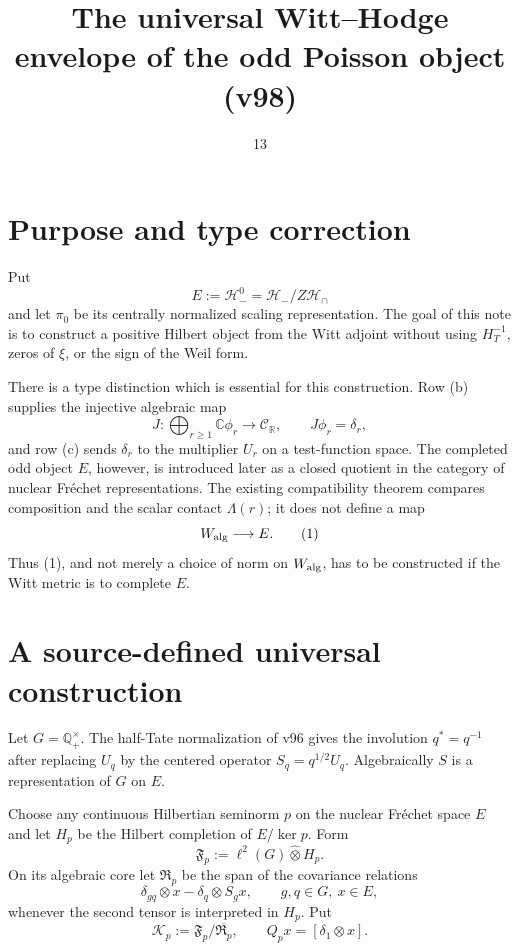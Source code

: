 \documentclass[11pt]{article}
\title{The universal Witt--Hodge envelope of the odd Poisson object (v98)}
\date{13}
\begin{document}
\maketitle

\section{Purpose and type correction}

Put
\[
 E:=\mathcal H_-^0=\mathcal H_-/Z\mathcal H_\cap
\]
and let $\pi_0$ be its centrally normalized scaling representation.  The
goal of this note is to construct a positive Hilbert object from the Witt
adjoint without using $H_T^{-1}$, zeros of $\xi$, or the sign of the Weil
form.

There is a type distinction which is essential for this construction.
Row (b) supplies the injective algebraic map
\[
 J:\bigoplus_{r\ge1}\mathbb C\phi_r\longrightarrow\mathcal C_{\mathbb R},
 \qquad J\phi_r=\delta_r,
\]
and row (c) sends $\delta_r$ to the multiplier $U_r$ on a test-function
space.  The completed odd object $E$, however, is introduced later as a
closed quotient in the category of nuclear Fr\'echet representations.
The existing compatibility theorem compares composition and the scalar
contact $\Lambda(r)$; it does not define a map
\begin{equation}
       W_{\rm alg}\longrightarrow E.                 \tag{1}
\end{equation}
Thus (1), and not merely a choice of norm on $W_{\rm alg}$, has to be
constructed if the Witt metric is to complete $E$.

\section{A source-defined universal construction}

Let $G=\mathbb Q_+^\times$.  The half-Tate normalization of v96 gives the
involution $q^*=q^{-1}$ after replacing $U_q$ by the centered operator
$S_q=q^{1/2}U_q$.  Algebraically $S$ is a representation of $G$ on $E$.

Choose any continuous Hilbertian seminorm $p$ on the nuclear Fr\'echet
space $E$ and let $H_p$ be the Hilbert completion of $E/\ker p$.  Form
\[
 \mathfrak F_p:=\ell^2(G)\widehat\otimes H_p.
\]
On its algebraic core let $\mathfrak R_p$ be the span of the covariance
relations
\begin{equation}
 \delta_{gq}\otimes x-\delta_q\otimes S_gx,
 \qquad g,q\in G,\ x\in E,                           \tag{2}
\end{equation}
whenever the second tensor is interpreted in $H_p$.  Put
\begin{equation}
 \mathscr K_p:=\mathfrak F_p/\overline{\mathfrak R_p},
 \qquad Q_p x=[\delta_1\otimes x].                   \tag{3}
\end{equation}
\end{document}
